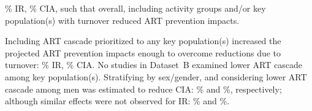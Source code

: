 \% IR, \% CIA,
such that overall, including activity groups and/or key population(s) with turnover
reduced ART prevention impacts.
\par
Including ART cascade prioritized to any key population(s)
increased the projected ART prevention impacts enough to overcome reductions due to turnover:
\% IR, \% CIA.
No studies in Dataset~B examined lower ART cascade among key population(s).
Stratifying by sex/gender, and considering lower ART cascade among men was estimated to reduce CIA:
\% and \%, respectively;
although similar effects were not observed for IR:
\% and \%.